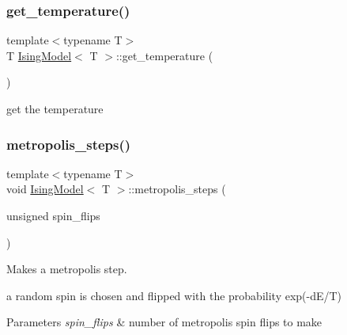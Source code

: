 \mbox{\label{classIsingModel_ad0252a860a935d1be2542f15b5c25936}} 
\subsubsection{\texorpdfstring{get\+\_\+temperature()}{get\_temperature()}}
{\footnotesize\ttfamily template$<$typename T$>$ \\
T \mbox{\hyperlink{classIsingModel}{Ising\+Model}}$<$ T $>$\+::get\+\_\+temperature (\begin{DoxyParamCaption}{ }\end{DoxyParamCaption})\hspace{0.3cm}{\ttfamily [inline]}}



get the temperature 

\mbox{\label{classIsingModel_a195316f577d71297e9634fa6fdeacc44}} 
\subsubsection{\texorpdfstring{metropolis\+\_\+steps()}{metropolis\_steps()}}
{\footnotesize\ttfamily template$<$typename T$>$ \\
void \mbox{\hyperlink{classIsingModel}{Ising\+Model}}$<$ T $>$\+::metropolis\+\_\+steps (\begin{DoxyParamCaption}\item[{unsigned}]{spin\+\_\+flips }\end{DoxyParamCaption})\hspace{0.3cm}{\ttfamily [inline]}}



Makes a metropolis step. 

a random spin is chosen and flipped with the probability exp(-\/d\+E/T) 
\begin{DoxyParams}{Parameters}
{\em spin\+\_\+flips} & number of metropolis spin flips to make \\
\hline
\end{DoxyParams}
\mbox{\label{classIsingModel_ac16bfdd5bb4012162bedd90034962f58}} 
